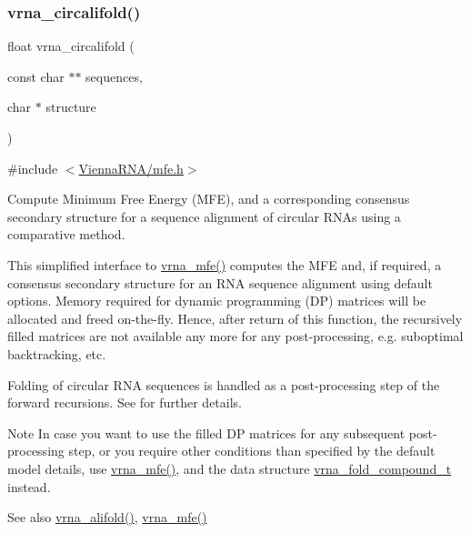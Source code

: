 \subsubsection{\texorpdfstring{vrna\_circalifold()}{vrna\_circalifold()}}
{\footnotesize\ttfamily float vrna\+\_\+circalifold (\begin{DoxyParamCaption}\item[{const char $\ast$$\ast$}]{sequences,  }\item[{char $\ast$}]{structure }\end{DoxyParamCaption})}



{\ttfamily \#include $<$\mbox{\hyperlink{mfe_8h}{Vienna\+R\+N\+A/mfe.\+h}}$>$}



Compute Minimum Free Energy (M\+FE), and a corresponding consensus secondary structure for a sequence alignment of circular R\+N\+As using a comparative method. 

This simplified interface to \mbox{\hyperlink{group__mfe__global_gabd3b147371ccf25c577f88bbbaf159fd}{vrna\+\_\+mfe()}} computes the M\+FE and, if required, a consensus secondary structure for an R\+NA sequence alignment using default options. Memory required for dynamic programming (DP) matrices will be allocated and free\textquotesingle{}d on-\/the-\/fly. Hence, after return of this function, the recursively filled matrices are not available any more for any post-\/processing, e.\+g. suboptimal backtracking, etc.

Folding of circular R\+NA sequences is handled as a post-\/processing step of the forward recursions. See \cite{hofacker:2006} for further details.

\begin{DoxyNote}{Note}
In case you want to use the filled DP matrices for any subsequent post-\/processing step, or you require other conditions than specified by the default model details, use \mbox{\hyperlink{group__mfe__global_gabd3b147371ccf25c577f88bbbaf159fd}{vrna\+\_\+mfe()}}, and the data structure \mbox{\hyperlink{group__fold__compound_ga1b0cef17fd40466cef5968eaeeff6166}{vrna\+\_\+fold\+\_\+compound\+\_\+t}} instead.
\end{DoxyNote}
\begin{DoxySeeAlso}{See also}
\mbox{\hyperlink{group__mfe__global_ga6c9d3bef3e92c6d423ffac9f981418c1}{vrna\+\_\+alifold()}}, \mbox{\hyperlink{group__mfe__global_gabd3b147371ccf25c577f88bbbaf159fd}{vrna\+\_\+mfe()}}
\end{DoxySeeAlso}

